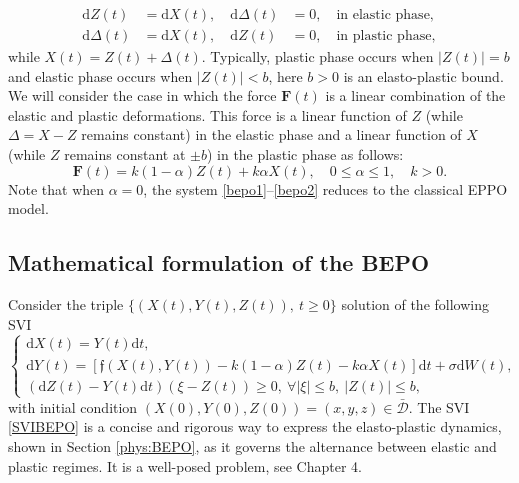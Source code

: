 \documentclass[12pt]{article}
\numberwithin{equation}{section}
\newcommand{\D}{\mathcal{D}}
\def\d{\mathrm{d}}
\begin{document}
\begin{eqnarray*}
	\d Z(t) 
	& = \d X (t), \quad \d \Delta(t) 
	& = 0, \quad \mbox{in elastic phase},\\
	\d \Delta(t) 
	& = \d X (t), \quad \d Z(t) 
	& = 0, \quad \mbox{in plastic phase},
\end{eqnarray*}
while $X(t) = Z(t) + \Delta(t)$. 
Typically, plastic phase occurs when $ \vert Z(t) \vert = b$ and 
elastic phase occurs when $\vert Z(t) \vert < b$, 
here $b>0$ is an elasto-plastic bound. 
We will consider the case in which the force $\mathbf{F}(t)$ is 
a linear combination of the elastic and plastic deformations. 
This force is a linear function of $Z$ 
(while $\Delta = X -Z$ remains constant) in the elastic phase and 
a linear function of $X$ (while $Z$ remains constant at $\pm b$) in the plastic phase as follows:
\begin{equation}\label{bepo2}
	\mathbf{F}(t) 
	= k (1-\alpha) Z(t) + k \alpha X(t), \quad 0 \leq \alpha \leq 1, \quad k > 0.
\end{equation} 
Note that when $\alpha = 0$, the system \eqref{bepo1}--\eqref{bepo2} reduces to the classical EPPO model.


\subsection{Mathematical formulation of the BEPO}
Consider the triple 
$\{ (X(t),Y(t),Z(t)) , \: t \geq 0 \}$ 
solution of the following SVI
\vspace{-0.5em}
\begin{equation}\label{SVIBEPO}
	\begin{cases}
		\d X(t) =  Y(t)\d t,\\
		\d Y(t) = [\mathfrak{f}(X(t),Y(t)) - k (1-\alpha) Z(t) - k \alpha X(t)]\d t + \sigma  \d W(t),\\
		(\d Z(t) - Y(t)\d t)(\xi - Z(t)) \geq 0, ~\forall |\xi| \leq b, ~|Z(t)| \leq b,  
	\end{cases}
\end{equation}
with initial condition 
$(X(0),Y(0),Z(0)) = (x,y,z) \in \bar{\D}$.
The SVI \eqref{SVIBEPO} is a concise and rigorous way to express the elasto-plastic dynamics, 
shown in Section \ref{phys:BEPO}, as it governs the alternance between elastic and plastic regimes.
It is a well-posed problem, see \cite{PR14} Chapter 4. 
\end{document}
